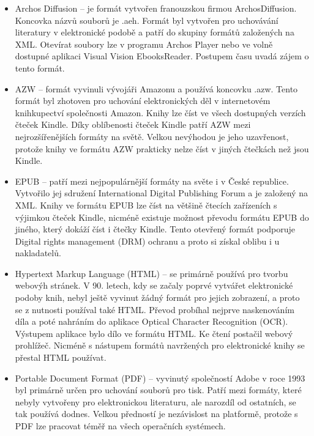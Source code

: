             \begin{itemize}
                \item Archos Diffusion – je formát vytvořen franouzskou firmou  ArchosDiffusion. Koncovka názvů souborů je .aeh. Formát byl vytvořen pro uchovávání literatury v elektronické podobě a patří do skupiny formátů založených na XML. Otevírat soubory lze v programu Archos Player nebo ve volně dostupné aplikaci Visual Vision EbooksReader. Postupem času uvadá zájem o tento formát.
                
                \item AZW – formát vyvinuli vývojáři Amazonu a používá koncovku .azw. Tento formát byl zhotoven pro uchování elektronických děl v internetovém knihkupectví společnosti Amazon. Knihy lze číst ve všech dostupných verzích čteček Kindle. Díky oblíbenosti čteček Kindle patří AZW mezi nejrozšířenějších formáty na světě. Velkou nevýhodou je jeho uzavřenost, protože knihy ve formátu AZW prakticky nelze číst v jiných čtečkách než jsou Kindle.
                
                \item EPUB – patří mezi nejpopulárnější formáty na světe i v České republice. Vytvořilo jej sdružení International Digital Publishing Forum a je založený na XML. Knihy ve formátu EPUB lze číst na většině čtecích zařízeních s výjimkou čteček Kindle, nicméně existuje možnost převodu formátu EPUB do jiného, který dokáží číst i čtečky Kindle. Tento otevřený formát podporuje Digital rights management (DRM) ochranu a proto si získal oblibu i u nakladatelů.
                
                \item Hypertext Markup Language (HTML) – se primárně používá pro tvorbu webovýh stránek. V 90. letech, kdy se začaly poprvé vytvářet elektronické podoby knih, nebyl ještě vyvinut žádný formát pro jejich zobrazení, a proto se z nutnosti používal také HTML. Převod probíhal nejprve naskenováním díla a poté nahráním do aplikace Optical Character Recognition (OCR). Výstupem aplikace bylo dílo ve formátu HTML. Ke čtení postačil webový prohlížeč. Nicméně s nástupem formátů navržených pro elektronické knihy se přestal HTML používat.
                
                \item Portable Document Format (PDF) – vyvinutý společností Adobe v roce 1993 byl primárně určen pro uchování souborů pro tisk. Patří mezi formáty, které nebyly vytvořeny pro elektronickou literaturu, ale narozdíl od ostatních, se tak používá dodnes. Velkou předností je nezávislost na platformě, protože s PDF lze pracovat téměř na všech operačních systémech. 
                

\end{itemize}
